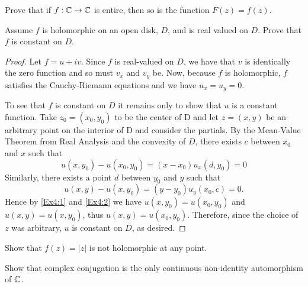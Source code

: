 \documentclass[10pt]{amsart}
\begin{document}
\begin{thm}
  \label{Ex3}
  Prove that if $f:\mathbb{C} \rightarrow \mathbb{C}$ is entire, then so is the function $F(z) = \overline{f(\overline{z})}$.
\end{thm}

\begin{thm}
  \label{Ex4}
  Assume $f$ is holomorphic on an open disk, $D$, and is real valued on $D$.  
  Prove that $f$ is constant on $D$.
  \begin{proof}
    Let $f= u + iv$.  
    Since $f$ is real-valued on $D$, we have that $v$ is identically the zero function and so must $v_x$ and $v_y$ be.
    Now, because $f$ is holomorphic, $f$ satisfies the Cauchy-Riemann equations and we have $u_x = u_y = 0$.

    To see that $f$ is constant on $D$ it remains only to show that $u$ is a constant function.
    Take $z_0 = (x_0,y_0)$ to be the center of D and let $z = (x,y)$ be an arbitrary point on the interior of D and consider the partials.
    By the Mean-Value Theorem from Real Analysis and the convexity of $D$, there exists $c$ between $x_0$ and $x$ such that 
    \begin{equation}
      \label{Ex4:1}
      u(x,y_0) - u(x_0,y_0) = (x - x_0)u_x(d,y_0) = 0
    \end{equation}
    Similarly, there exists a point $d$ between $y_0$ and $y$ such that 
    \begin{equation}
      \label{Ex4:2}
      u(x,y) - u(x,y_0) = (y - y_0)u_y(x_0,c) = 0.
    \end{equation}
    Hence by \eqref{Ex4:1} and \eqref{Ex4:2} we have $u(x,y_0) = u(x_0,y_0)$ and  $u(x,y) = u(x,y_0)$, thus $u(x,y) = u(x_0,y_0)$.
    Therefore, since the choice of $z$ was arbitrary, $u$ is constant on $D$, as desired.
  \end{proof}
\end{thm}

\begin{thm}
  \label{Ex5}
  Show that $f(z) = |z|$ is not holomorphic at any point.
\end{thm}

\begin{thm}
  \label{Ex6}
  Show that complex conjugation is the only continuous non-identity automorphism of $\mathbb{C}$.
\end{thm}
\end{document}
